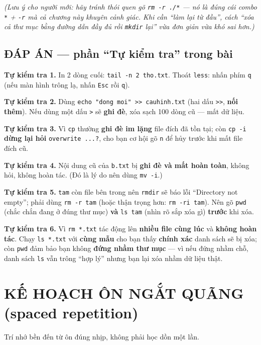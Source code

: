\documentclass[12pt,a4paper]{article}
\newcommand{\cmd}[1]{\texttt{#1}}
\begin{document}
\textit{(Lưu ý cho người mới: hãy tránh thói quen gõ \cmd{rm -r ./*} --- nó là đúng cái combo \cmd{*} + \cmd{-r} mà cả chương này khuyên cảnh giác. Khi cần ``làm lại từ đầu'', cách ``xóa cả thư mục bằng đường dẫn đầy đủ rồi \cmd{mkdir} lại'' vừa đơn giản vừa khó sai hơn.)}

\subsection*{ĐÁP ÁN --- phần ``Tự kiểm tra'' trong bài}

\textbf{Tự kiểm tra 1.} In 2 dòng cuối: \cmd{tail -n 2 tho.txt}. Thoát \cmd{less}: nhấn phím \cmd{q} (nếu màn hình trông lạ, nhấn \cmd{Esc} rồi \cmd{q}).

\textbf{Tự kiểm tra 2.} Dùng \cmd{echo "dong moi" >> cauhinh.txt} (hai dấu \cmd{>>}, \textbf{nối thêm}). Nếu dùng một dấu \cmd{>} sẽ \textbf{ghi đè}, xóa sạch 100 dòng cũ --- mất dữ liệu.

\textbf{Tự kiểm tra 3.} Vì \cmd{cp} thường \textbf{ghi đè im lặng} file đích đã tồn tại; còn \cmd{cp -i} \textbf{dừng lại hỏi} \cmd{overwrite ...?}, cho bạn cơ hội gõ \cmd{n} để hủy trước khi mất file đích cũ.

\textbf{Tự kiểm tra 4.} Nội dung cũ của \cmd{b.txt} bị \textbf{ghi đè và mất hoàn toàn}, không hỏi, không hoàn tác. (Đó là lý do nên dùng \cmd{mv -i}.)

\textbf{Tự kiểm tra 5.} \cmd{tam} còn file bên trong nên \cmd{rmdir} sẽ báo lỗi ``Directory not empty''; phải dùng \cmd{rm -r tam} (hoặc thận trọng hơn: \cmd{rm -ri tam}). Nên gõ \cmd{pwd} (chắc chắn đang ở đúng thư mục) \textbf{và} \cmd{ls tam} (nhìn rõ sắp xóa gì) \textbf{trước} khi xóa.

\textbf{Tự kiểm tra 6.} Vì \cmd{rm *.txt} tác động lên \textbf{nhiều file cùng lúc} và \textbf{không hoàn tác}. Chạy \cmd{ls *.txt} với \textbf{cùng mẫu} cho bạn thấy \textbf{chính xác} danh sách sẽ bị xóa; còn \cmd{pwd} đảm bảo bạn không \textbf{đứng nhầm thư mục} --- vì nếu đứng nhầm chỗ, danh sách \cmd{ls} vẫn trông ``hợp lý'' nhưng bạn lại xóa nhầm dữ liệu thật.

\section{KẾ HOẠCH ÔN NGẮT QUÃNG (spaced repetition)}

Trí nhớ bền đến từ ôn đúng nhịp, không phải học dồn một lần.
\end{document}
